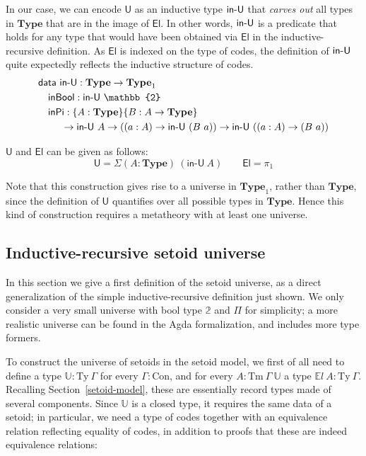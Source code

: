 \documentclass{easychair}
\newcommand{\GG}{\Gamma}
\newcommand{\ad}[1]{\AgdaFunction{#1}}
\newcommand{\mType}{\mathbf{Type}}
\newcommand{\Con}{\mathrm{Con}}
\newcommand{\Ty}{\mathrm{Ty}}
\newcommand{\Tm}{\mathrm{Tm}}
\newcommand{\U}{\textsf{U}}
\newcommand{\El}{\textsf{El}}
\newcommand{\Uty}{\mathds{U}}
\providecommand\mathbbm{\mathbb}
\begin{document}
In our case, we can encode $\U$ as an inductive type $\ad{in-U}$ that
\emph{carves out} all types in $\mType$ that are in the image of $\El$. In other
words, $\ad{in-U}$ is a predicate that holds for any type that would have been
obtained via $\El$ in the inductive-recursive definition. As $\El$ is indexed on
the type of codes, the definition of $\ad{in-U}$ quite expectedly reflects the
inductive structure of codes.
%
\begin{align*}
  & \textsf{data}\ \ad{in-U} : \mType \to \mType_1 \\
  & \quad \textsf{inBool} : \textsf{in-U}\ \mathbbm{2} \\
  & \quad \textsf{inPi}
  :  \{A : \mType\} \{B : A \to \mType\}\\
  & \ \qquad \to \ad{in-U}\ A
  \to ((a : A) \to \ad{in-U}\ (B\ a))
  \to \ad{in-U}\ ((a : A) \to (B\ a))
\end{align*}

$\U$ and $\El$ can be given as follows:
\[
\U = \Sigma (A : \mType)\ (\textsf{in-U}\ A) \qquad \El = \pi_1
\]

Note that this construction gives rise to a universe in $\mType_1$, rather than
$\mType$, since the definition of $\U$ quantifies over all possible types in
$\mType$. Hence this kind of construction requires a metatheory with at least
one universe.

\subsection{Inductive-recursive setoid universe}\label{ir-setoid-universe}

In this section we give a first definition of the setoid universe, as a direct
generalization of the simple inductive-recursive definition just shown. We only
consider a very small universe with bool type $\mathbbm{2}$ and $\Pi$ for
simplicity; a more realistic universe can be found in the Agda formalization,
and includes more type formers.

To construct the universe of setoids in the setoid model, we first of all need
to define a type $\Uty : \Ty\ \GG$ for every $\GG : \Con$, and for every $A :
\Tm\ \GG\ \Uty$ a type $\mathds{E}l\ A : \Ty\ \GG$. Recalling
Section~\ref{setoid-model}, these are essentially record types made of several
components. Since $\Uty$ is a closed type, it requires the same data of a
setoid; in particular, we need a type of codes together with an equivalence
relation reflecting equality of codes, in addition to proofs that these are
indeed equivalence relations:
%
\end{document}
